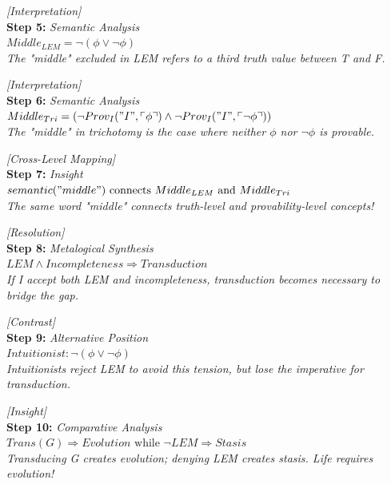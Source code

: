\documentclass[runningheads]{llncs}
\begin{document}
\noindent\textit{[Interpretation]}\\
\noindent\textbf{Step 5:} \hfill \textit{Semantic Analysis}\\
\noindent$Middle_{LEM} = \neg(\phi \lor \neg\phi)$\\
\textit{The "middle" excluded in LEM refers to a third truth value between T and F.}

\vspace{0.8em}

\noindent\textit{[Interpretation]}\\
\noindent\textbf{Step 6:} \hfill \textit{Semantic Analysis}\\
\noindent$Middle_{Tri} = (\neg Prov_I("I", \ulcorner\phi\urcorner) \land \neg Prov_I("I", \ulcorner\neg\phi\urcorner))$\\
\textit{The "middle" in trichotomy is the case where neither $\phi$ nor $\neg\phi$ is provable.}

\vspace{0.8em}

\noindent\textit{[Cross-Level Mapping]}\\
\noindent\textbf{Step 7:} \hfill \textit{Insight}\\
\noindent$semantic("middle") \text{ connects } Middle_{LEM} \text{ and } Middle_{Tri}$\\
\textit{The same word "middle" connects truth-level and provability-level concepts!}

\vspace{0.8em}

\noindent\textit{[Resolution]}\\
\noindent\textbf{Step 8:} \hfill \textit{Metalogical Synthesis}\\
\noindent$LEM \land Incompleteness \Rightarrow Transduction$\\
\textit{If I accept both LEM and incompleteness, transduction becomes necessary to bridge the gap.}

\vspace{0.8em}

\noindent\textit{[Contrast]}\\
\noindent\textbf{Step 9:} \hfill \textit{Alternative Position}\\
\noindent$Intuitionist: \neg(\phi \lor \neg\phi)$\\
\textit{Intuitionists reject LEM to avoid this tension, but lose the imperative for transduction.}

\vspace{0.8em}

\noindent\textit{[Insight]}\\
\noindent\textbf{Step 10:} \hfill \textit{Comparative Analysis}\\
\noindent$Trans(G) \Rightarrow Evolution \text{ while } \neg LEM \Rightarrow Stasis$\\
\textit{Transducing G creates evolution; denying LEM creates stasis. Life requires evolution!}
\end{document}
